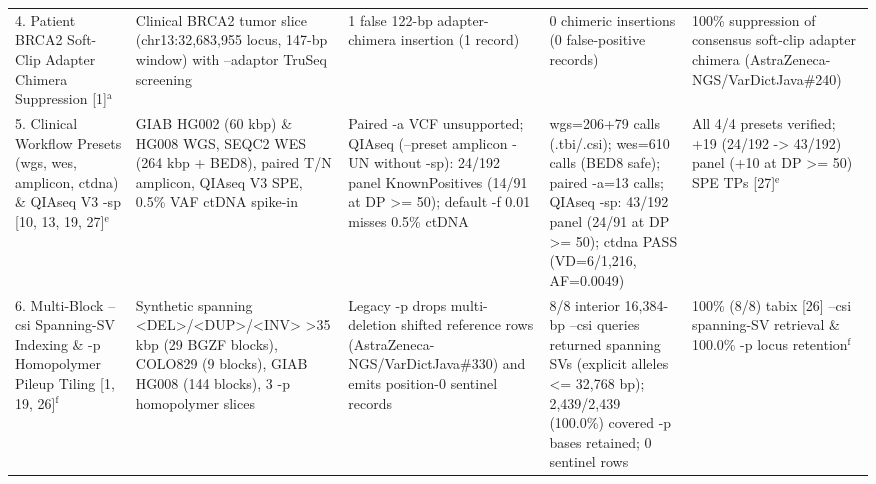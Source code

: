 \begin{table}[htbp]
{\begin{tabular}{lllll}
4. Patient BRCA2 Soft-Clip Adapter Chimera Suppression [1]$^{\text{a}}$ & Clinical BRCA2 tumor slice (chr13:32,683,955 locus, 147-bp window) with --adaptor TruSeq screening & 1 false 122-bp adapter-chimera insertion (1 record) & 0 chimeric insertions (0 false-positive records) & 100\% suppression of consensus soft-clip adapter chimera (AstraZeneca-NGS/VarDictJava\#240) \\
5. Clinical Workflow Presets (wgs, wes, amplicon, ctdna) \& QIAseq V3 -sp [10, 13, 19, 27]$^{\text{e}}$ & GIAB HG002 (60 kbp) \& HG008 WGS, SEQC2 WES (264 kbp + BED8), paired T/N amplicon, QIAseq V3 SPE, 0.5\% VAF ctDNA spike-in & Paired -a VCF unsupported; QIAseq (--preset amplicon -UN without -sp): 24/192 panel KnownPositives (14/91 at DP \textgreater{}= 50); default -f 0.01 misses 0.5\% ctDNA & wgs=206+79 calls (.tbi/.csi); wes=610 calls (BED8 safe); paired -a=13 calls; QIAseq -sp: 43/192 panel (24/91 at DP \textgreater{}= 50); ctdna PASS (VD=6/1,216, AF=0.0049) & All 4/4 presets verified; +19 (24/192 -\textgreater{} 43/192) panel (+10 at DP \textgreater{}= 50) SPE TPs [27]$^{\text{e}}$ \\
6. Multi-Block --csi Spanning-SV Indexing \& -p Homopolymer Pileup Tiling [1, 19, 26]$^{\text{f}}$ & Synthetic spanning \textless{}DEL\textgreater{}/\textless{}DUP\textgreater{}/\textless{}INV\textgreater{} \textgreater{}35 kbp (29 BGZF blocks), COLO829 (9 blocks), GIAB HG008 (144 blocks), 3 -p homopolymer slices & Legacy -p drops multi-deletion shifted reference rows (AstraZeneca-NGS/VarDictJava\#330) and emits position-0 sentinel records & 8/8 interior 16,384-bp --csi queries returned spanning SVs (explicit alleles \textless{}= 32,768 bp); 2,439/2,439 (100.0\%) covered -p bases retained; 0 sentinel rows & 100\% (8/8) tabix [26] --csi spanning-SV retrieval \& 100.0\% -p locus retention$^{\text{f}}$ \\
\hline
\end{tabular}%
}

\end{table}
